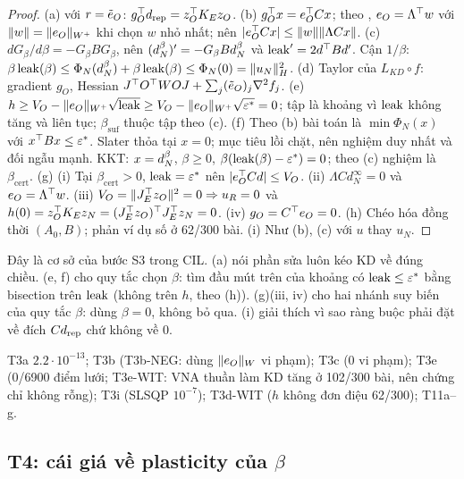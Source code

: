 \begin{proof}
(a)  với $r=\tilde e_O$: $g_O^{\top}d_{\mathrm{rep}}=z_O^{\top} K_Ez_O$.
(b) $g_O^{\top} x=e_O^{\top} Cx$; theo , $e_O=\Lambda^{\top} w$ với $\lVert w\rVert=\lVert e_O\rVert_{W^+}$ khi chọn $w$ nhỏ nhất; nên $|e_O^{\top} Cx|\le\lVert w\rVert\lVert \Lambda Cx\rVert$.
(c) $dG_\beta/d\beta=-G_\beta BG_\beta$, nên $(d_N^{\beta})'=-G_\beta Bd_N^{\beta}$ và $\operatorname{leak}'=2d^{\top} Bd'$. Cận $1/\beta$: $\beta\operatorname{leak}(\beta)\le\Phi_N(d_N^{\beta})+\beta\operatorname{leak}(\beta)\le\Phi_N(0)=\lVert u_N\rVert_H^2$.
(d) Taylor của $L_{KD}\circ f$: gradient $g_O$, Hessian $J^{\top} O^{\top} WOJ+\sum_j(\tilde e_O)_j\nabla^2f_j$.
(e) $h\ge V_O-\lVert e_O\rVert_{W^+}\sqrt{\operatorname{leak}}\ge V_O-\lVert e_O\rVert_{W^+}\sqrt{\varepsilon^*}=0$; tập là khoảng vì $\operatorname{leak}$ không tăng và liên tục; $\beta_{\mathrm{suf}}$ thuộc tập theo (c).
(f) Theo (b) bài toán là $\min\Phi_N(x)$ với $x^{\top} Bx\le\varepsilon^*$. Slater thỏa tại $x=0$; mục tiêu lồi chặt, nên nghiệm duy nhất và đối ngẫu mạnh. KKT: $x=d_N^{\beta}$, $\beta\ge0$, $\beta(\operatorname{leak}(\beta)-\varepsilon^*)=0$; theo (c) nghiệm là $\beta_{\mathrm{cert}}$.
(g) (i) Tại $\beta_{\mathrm{cert}}>0$, $\operatorname{leak}=\varepsilon^*$ nên $|e_O^{\top} Cd|\le V_O$. (ii) $\Lambda Cd_N^\infty=0$ và $e_O=\Lambda^{\top} w$. (iii) $V_O=\lVert J_E^{\top} z_O\rVert^2=0\Rightarrow u_R=0$ và $h(0)=z_O^{\top} K_Ez_N=(J_E^{\top} z_O)^{\top} J_E^{\top} z_N=0$. (iv) $g_O=C^{\top} e_O=0$.
(h) Chéo hóa đồng thời $(A_0,B)$; phản ví dụ số ở 62/300 bài.
(i) Như (b), (c) với $u$ thay $u_N$.
\end{proof}
\begin{hequa}
Đây là cơ sở của bước S3 trong CIL. (a) nói phần sửa luôn kéo KD về đúng chiều. (e, f) cho quy tắc chọn $\beta$: tìm đầu mút trên của khoảng có $\operatorname{leak}\le\varepsilon^*$ bằng bisection trên $\operatorname{leak}$ (không trên $h$, theo (h)). (g)(iii, iv) cho hai nhánh suy biến của quy tắc $\beta$: dùng $\beta=0$, không bỏ qua. (i) giải thích vì sao ràng buộc phải đặt về đích $Cd_{\mathrm{rep}}$ chứ không về $0$.
\end{hequa}
\begin{kiem}
T3a $2.2\cdot10^{-13}$; T3b (T3b-NEG: dùng $\lVert e_O\rVert_W$ vi phạm); T3c (0 vi phạm); T3e (0/6900 điểm lưới; T3e-WIT: VNA thuần làm KD tăng ở 102/300 bài, nên chứng chỉ không rỗng); T3i (SLSQP $10^{-7}$); T3d-WIT ($h$ không đơn điệu 62/300); T11a--g.
\end{kiem}

\subsection{T4: cái giá về plasticity của $\beta$}

